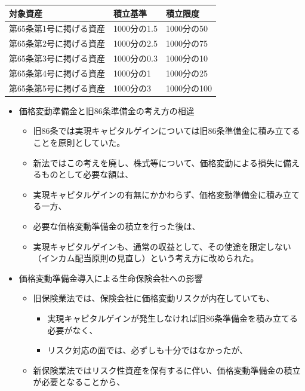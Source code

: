 \documentclass[report,gutter=10mm,fore-edge=10mm,uplatex,dvipdfmx]{jlreq}
\begin{document}
\begin{longtable}[]{@{}lll@{}}
\toprule
対象資産 & 積立基準 & 積立限度\tabularnewline
\midrule
\endhead
第65条第1号に掲げる資産 & 1000分の1.5 & 1000分の50\tabularnewline
第65条第2号に掲げる資産 & 1000分の2.5 & 1000分の75\tabularnewline
第65条第3号に掲げる資産 & 1000分の0.3 & 1000分の10\tabularnewline
第65条第4号に掲げる資産 & 1000分の1 & 1000分の25\tabularnewline
第65条第5号に掲げる資産 & 1000分の3 & 1000分の100\tabularnewline
\bottomrule
\end{longtable}

\begin{itemize}
\tightlist
\item
  価格変動準備金と旧86条準備金の考え方の相違

  \begin{itemize}
  \tightlist
  \item
    旧86条では実現キャピタルゲインについては旧86条準備金に積み立てることを原則としていた。
  \item
    新法ではこの考えを廃し、株式等について、価格変動による損失に備えるものとして必要な額は、
  \item
    実現キャピタルゲインの有無にかかわらず、価格変動準備金に積み立てる一方、
  \item
    必要な価格変動準備金の積立を行った後は、
  \item
    実現キャピタルゲインも、通常の収益として、その使途を限定しない（インカム配当原則の見直し）という考え方に改められた。
  \end{itemize}
\item
  価格変動準備金導入による生命保険会社への影響

  \begin{itemize}
  \tightlist
  \item
    旧保険業法では、保険会社に価格変動リスクが内在していても、

    \begin{itemize}
    \tightlist
    \item
      実現キャピタルゲインが発生しなければ旧86条準備金を積み立てる必要がなく、
    \item
      リスク対応の面では、必ずしも十分ではなかったが、
    \end{itemize}
  \item
    新保険業法ではリスク性資産を保有するに伴い、価格変動準備金の積立が必要となることから、


\end{itemize}
\end{itemize}
\end{document}
